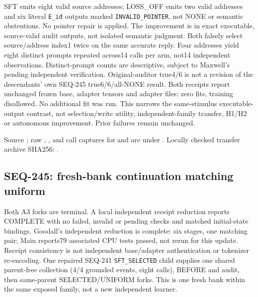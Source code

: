 \documentclass[11pt]{article}
\begin{document}
SFT emits eight valid source addresses; LOSS\_OFF emits two valid addresses
and six literal \texttt{E\_id} outputs marked \texttt{INVALID\_POINTER}, not
NONE or semantic abstentions. No pointer repair is applied. The improvement
is in exact executable, source-valid audit outputs, not isolated semantic judgment.
Both falsely select source/address index1 twice on the same accurate reply.
Four addresses yield eight distinct prompts repeated across14 calls per arm,
not14 independent observations. Distinct-prompt counts are descriptive,
subject to Maxwell's pending independent verification. Original-auditor true4/6
is not a revision of the descendants' own SEQ-245 true6/6/all-NONE result.
Both receipts report unchanged frozen base, adapter tensors and adapter files;
zero fits, training disallowed. No additional fit was run. This narrows the
same-stimulus executable-output contrast, not selection/write utility, independent-family
transfer, H1/H2 or autonomous improvement. Prior failures remain unchanged.

Source ; raw , ,
 and call captures for  and
 are under
.
Locally checked transfer archive SHA256:
.

\subsection{SEQ-245: fresh-bank continuation matching uniform}
\label{sec:fresh-reader-cycle}

Both A3 forks are terminal. A local independent receipt reduction reports
COMPLETE with no failed, invalid or pending checks and matched initial-state
bindings. Goodall's independent reduction is complete: six stages, one matching
pair; Main reports79 associated CPU tests passed, not rerun for this update.
Receipt consistency is not independent base/adapter authentication or tokenizer
re-encoding. One repaired SEQ-241 \texttt{SFT\_SELECTED} child supplies one
shared parent-free collection (4/4 grounded events, eight calls), BEFORE and
audit, then same-parent SELECTED/UNIFORM forks. This is one fresh bank within
the same exposed family, not a new independent learner.
\end{document}
